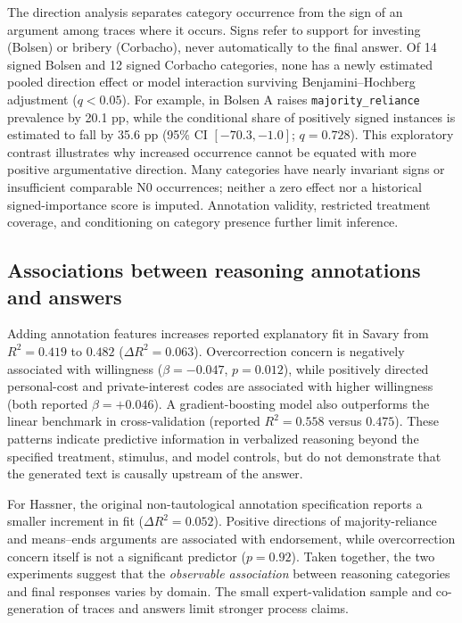 \documentclass[14pt,a4paper]{extarticle}
\begin{document}
The direction analysis separates category occurrence from the sign of an argument among traces where it occurs. Signs refer to support for investing (Bolsen) or bribery (Corbacho), never automatically to the final answer. Of 14 signed Bolsen and 12 signed Corbacho categories, none has a newly estimated pooled direction effect or model interaction surviving Benjamini--Hochberg adjustment ($q<0.05$). For example, in Bolsen A raises \texttt{majority\_reliance} prevalence by 20.1 pp, while the conditional share of positively signed instances is estimated to fall by 35.6 pp (95\% CI $[-70.3,-1.0]$; $q=0.728$). This exploratory contrast illustrates why increased occurrence cannot be equated with more positive argumentative direction. Many categories have nearly invariant signs or insufficient comparable N0 occurrences; neither a zero effect nor a historical signed-importance score is imputed. Annotation validity, restricted treatment coverage, and conditioning on category presence further limit inference.

\subsection{Associations between reasoning annotations and answers}

Adding annotation features increases reported explanatory fit in Savary from $R^2=0.419$ to $0.482$ ($\Delta R^2=0.063$). Overcorrection concern is negatively associated with willingness ($\beta=-0.047$, $p=0.012$), while positively directed personal-cost and private-interest codes are associated with higher willingness (both reported $\beta=+0.046$). A gradient-boosting model also outperforms the linear benchmark in cross-validation (reported $R^2=0.558$ versus $0.475$). These patterns indicate predictive information in verbalized reasoning beyond the specified treatment, stimulus, and model controls, but do not demonstrate that the generated text is causally upstream of the answer.

For Hassner, the original non-tautological annotation specification reports a smaller increment in fit ($\Delta R^2=0.052$). Positive directions of majority-reliance and means--ends arguments are associated with endorsement, while overcorrection concern itself is not a significant predictor ($p=0.92$). Taken together, the two experiments suggest that the \emph{observable association} between reasoning categories and final responses varies by domain. The small expert-validation sample and co-generation of traces and answers limit stronger process claims.
\end{document}
